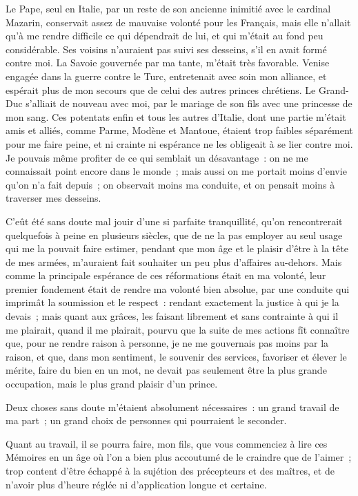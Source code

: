 \documentclass[french,twoside]{book} %
\begin{document}
Le Pape, seul en Italie, par un reste de son ancienne inimitié avec le cardinal Mazarin, conservait assez de mauvaise volonté pour les Français, mais elle n’allait qu’à me rendre difficile ce qui dépendrait de lui, et qui m’était au fond peu considérable. Ses voisins n’auraient pas suivi ses desseins, s’il en avait formé contre moi. La Savoie gouvernée par ma tante, m’était très favorable. Venise engagée dans la guerre contre le Turc, entretenait avec soin mon alliance, et espérait plus de mon secours que de celui des autres princes chrétiens. Le Grand-Duc s’alliait de nouveau avec moi, par le mariage de son fils avec une princesse de mon sang. Ces potentats enfin et tous les autres d’Italie, dont une partie m’était amis et alliés, comme Parme, Modène et Mantoue, étaient trop faibles séparément pour me faire peine, et ni crainte ni espérance ne les obligeait à se lier contre moi. Je pouvais même profiter de ce qui semblait un désavantage : on ne me connaissait point encore dans le monde ; mais aussi on me portait moins d’envie qu’on n’a fait depuis ; on observait moins ma conduite, et on pensait moins à traverser mes desseins.\par
C’eût été sans doute mal jouir d’une si parfaite tranquillité, qu’on rencontrerait quelquefois à peine en plusieurs siècles, que de ne la pas employer au seul usage qui me la pouvait faire estimer, pendant que mon âge et le plaisir d’être à la tête de mes armées, m’auraient fait souhaiter un peu plus d’affaires au-dehors. Mais comme la principale espérance de ces réformations était en ma volonté, leur premier fondement était de rendre ma volonté bien absolue, par une conduite qui imprimât la soumission et le respect : rendant exactement la justice à qui je la devais ; mais quant aux grâces, les faisant librement et sans contrainte à qui il me plairait, quand il me plairait, pourvu que la suite de mes actions fît connaître que, pour ne rendre raison à personne, je ne me gouvernais pas moins par la raison, et que, dans mon sentiment, le souvenir des services, favoriser et élever le mérite, faire du bien en un mot, ne devait pas seulement être la plus grande occupation, mais le plus grand plaisir d’un prince.\par
Deux choses sans doute m’étaient absolument nécessaires : un grand travail de ma part ; un grand choix de personnes qui pourraient le seconder.\par
Quant au travail, il se pourra faire, mon fils, que vous commenciez à lire ces Mémoires en un âge où l’on a bien plus accoutumé de le craindre que de l’aimer ; trop content d’être échappé à la sujétion des précepteurs et des maîtres, et de n’avoir plus d’heure réglée ni d’application longue et certaine.\par
\end{document}
